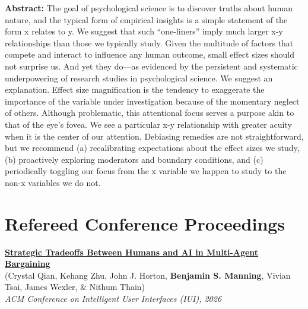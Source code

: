 \documentclass[margin,line,pifont,palatino,courier, 9pt]{res}
\begin{document}
\begin{resume}
\begin{singlespace}
\footnotesize
\textbf{Abstract:}
The goal of psychological science is to discover truths about human nature, and the typical form of empirical insights is a simple statement of the form x relates to y. We suggest that such ``one-liners'' imply much larger x-y relationships than those we typically study. Given the multitude of factors that compete and interact to influence any human outcome, small effect sizes should not surprise us. And yet they do---as evidenced by the persistent and systematic underpowering of research studies in psychological science. We suggest an explanation. Effect size magnification is the tendency to exaggerate the importance of the variable under investigation because of the momentary neglect of others. Although problematic, this attentional focus serves a purpose akin to that of the eye's fovea. We see a particular x-y relationship with greater acuity when it is the center of our attention. Debiasing remedies are not straightforward, but we recommend (a) recalibrating expectations about the effect sizes we study, (b) proactively exploring moderators and boundary conditions, and (c) periodically toggling our focus from the x variable we happen to study to the non-x variables we do not.
\end{singlespace}

\section{\sc Refereed Conference Proceedings }

\href{https://dl.acm.org/doi/10.1145/3742413.3789078}{\bf Strategic Tradeoffs Between Humans and AI in Multi-Agent Bargaining}\\
(Crystal Qian\footnotemark[\value{footnote}], Kehang Zhu\footnotemark[\value{footnote}], John J. Horton, \textbf{Benjamin S. Manning}, Vivian Tsai, James Wexler, \& Nithum Thain)\\
\textit{ACM Conference on Intelligent User Interfaces (IUI), 2026}


\end{resume}
\end{document}
